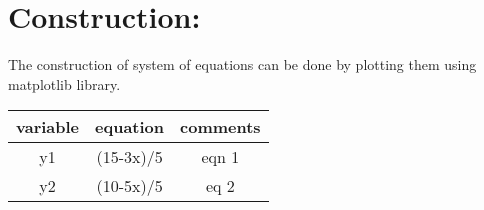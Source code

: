 \documentclass[a4paper,12pt,twocolumn]{article}
\begin{document}
\section{Construction:}
The construction of system of equations can be done by plotting them using matplotlib library.
\begin{table}[h]
        \centering
\setlength\extrarowheight{2pt}
        \begin{tabular}{|c|c|c|}
                \hline
		\textbf{variable} & \textbf{equation} & \textbf{comments}\\
		\hline
		y1 & (15-3x)/5 & eqn 1\\
		\hline
		y2 & (10-5x)/5 & eq 2\\
		\hline
	\end{tabular}
\end{table}
\end{document}
